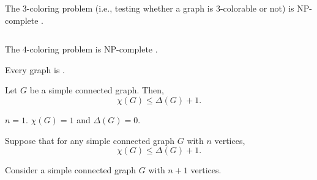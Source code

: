 \begin{frame}{}
  \begin{theorem}{}
    The $3$-coloring problem (i.e., testing whether a graph is $3$-colorable or not)
    is \textsf{NP-complete} .
  \end{theorem}

  \pause
  \begin{columns}
  \end{columns}
\end{frame}

\begin{frame}{}
  \begin{theorem}{}
    The $4$-coloring problem is \textsf{NP-complete} .
  \end{theorem}

  \pause
  \vspace{1.20cm}
  \begin{theorem}
    Every   graph is .
  \end{theorem}
\end{frame}

\begin{frame}{}
  \begin{theorem}
    Let $G$ be a simple connected graph. Then,
    \[
      \chi(G) \le \Delta(G) + 1.
    \]
  \end{theorem}

  \pause
  \begin{center}

    \pause
    \vspace{0.20cm}
    \begin{description}
      \setlength{\itemsep}{5pt}
      \item[Basis Step:] $n = 1$. $\chi(G) = 1$ and $\Delta(G) = 0$.
      \item[Induction Hypothesis:] Suppose that for any simple connected graph $G$
        with $n$ vertices,
        \[
          \chi(G) \le \Delta(G) + 1.
        \]
      \item[Induction Step:] Consider a simple connected graph $G$ with $n+1$ vertices.
    \end{description}
  \end{center}
\end{frame}

